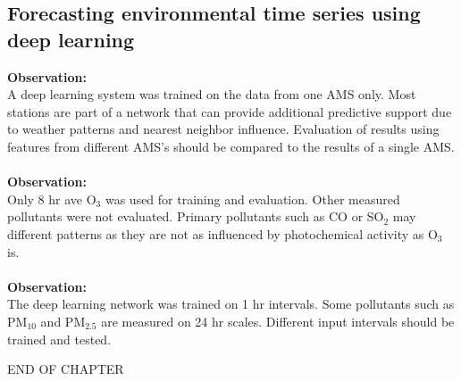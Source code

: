 \subsection*{Forecasting environmental time series using deep learning}
\noindent
\textbf{Observation:}\\
A deep learning system was trained on the data from one AMS only. Most stations are part of a network that can provide additional predictive support due to weather patterns and nearest neighbor influence. Evaluation of results using features from different AMS's should be compared to the results of a single AMS.\\
\noindent\\
\textbf{Observation:}\\
Only 8 hr ave O$_{3}$ was used for training and evaluation. Other measured pollutants were not evaluated. Primary pollutants such as CO or SO$_{2}$  may different patterns as they are not as influenced by photochemical activity as O$_{3}$ is.\\
\noindent\\
\textbf{Observation:}\\
The deep learning network was trained on 1 hr intervals. Some pollutants such as PM$_{10}$ and PM$_{2.5}$ are measured on 24 hr scales. Different input intervals should be trained and tested.

\bigskip

\begin{center}
END OF CHAPTER
\end{center}